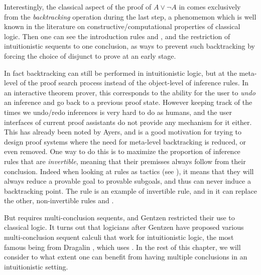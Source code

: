 Interestingly, the classical aspect of the proof of $A \lor \neg A$ in
 comes exclusively from the \emph{backtracking} operation during
the last step, a phenomemon which is well known in the literature on
constructive/computational properties of classical logic.
Then one can see the introduction rules {} and {},
and the restriction of intuitionistic sequents to one conclusion, as ways to
prevent such backtracking by forcing the choice of disjunct to prove at an early
stage.

In fact backtracking can still be performed in intuitionistic logic, but at the
meta-level of the proof search process instead of the object-level of inference
rules. In an interactive theorem prover, this corresponds to the ability for the
user to \emph{undo} an inference and go back to a previous proof state. However
keeping track of the times we undo/redo inferences is very hard to do as humans,
and the user interfaces of current proof assistants do not provide any mechanism
for it either. This has already been noted by Ayers, and is a good motivation for trying to design
proof systems where the need for meta-level backtracking is reduced, or even
removed. One way to do this is to maximize the proportion of inference rules
that are \emph{invertible}, meaning that their premisses always follow from
their conclusion. Indeed when looking at rules as tactics (see ),
it means that they will always reduce a provable goal to provable subgoals, and
thus can never induce a backtracking point. The {} rule is an example of
invertible rule, and in  it can replace the other, non-invertible rules
{} and {}.

But {} requires multi-conclusion sequents, and Gentzen restricted
their use to classical logic. It turns out that logicians after Gentzen have
proposed various multi-conclusion sequent calculi that work for intuitionistic
logic, the most famous being  from Dragalin
, which uses {}. In the rest of
this chapter, we will consider to what extent one can benefit from having
multiple conclusions in an intuitionistic setting.

